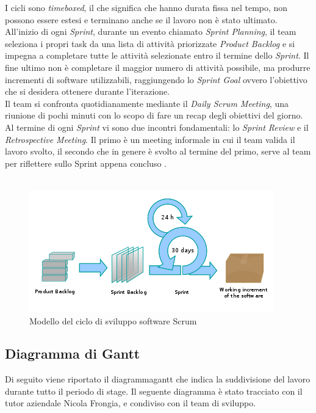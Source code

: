 \clearpage
I cicli sono \textit{timeboxed}, il che significa che hanno durata fissa nel tempo, non possono essere estesi e terminano anche se il lavoro non è stato ultimato. All’inizio di ogni \textit{Sprint}, durante un evento chiamato \textit{Sprint Planning}, il team seleziona i propri task da una lista di attività priorizzate \textit{Product Backlog} e si impegna a completare tutte le attività selezionate entro il termine dello \textit{Sprint}. Il fine ultimo non è completare il maggior numero di attività possibile, ma produrre incrementi di software utilizzabili, raggiungendo lo \textit{Sprint Goal} ovvero l’obiettivo che si desidera ottenere durante l’iterazione.\\
Il team si confronta quotidianamente mediante il \textit{Daily Scrum Meeting}, una riunione di pochi minuti con lo scopo di fare un recap degli obiettivi  del giorno. Al termine di ogni \textit{Sprint} vi sono due incontri fondamentali: lo \textit{Sprint Review} e il \textit{Retrospective Meeting}.
Il primo è un meeting informale in cui il team valida il lavoro svolto, il secondo che in genere è svolto al termine del primo, serve al team per riflettere sullo Sprint appena concluso \cite{scruminfo}.\\\\


\begin{figure}
\begin{center}
\includegraphics[width=1.0\columnwidth]{images/Scrum_process.png}
\end{center}
\caption{Modello del ciclo di sviluppo software Scrum}
\label{fig:scrum}
\end{figure}


\clearpage


\subsection{Diagramma di Gantt}
Di seguito viene riportato il \gls{diagrammagantt} che indica la suddivisione del lavoro durante tutto il periodo di stage. Il seguente diagramma è stato tracciato con il tutor aziendale Nicola Frongia, e condiviso con il team di sviluppo.\\ 



